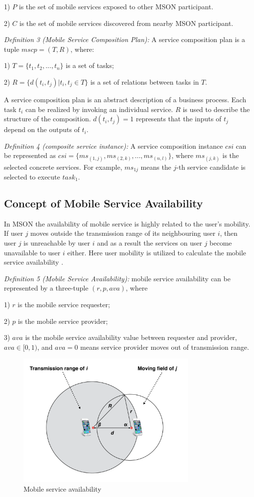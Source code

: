 \documentclass[10pt,journal,compsoc]{IEEEtran}
\begin{document}
​1) $P$ is the set of mobile services exposed to other MSON participant.

​2) $C$ is the set of mobile services discovered from nearby MSON participant.

\textit{Definition 3 (Mobile Service Composition Plan):} A service composition plan is a tuple $mscp = (T, R)$, where:

​1) $T = \{t_1,t_2,...,t_n\}$ is a set of tasks;

​2) $R = \{d(t_i,t_j)|t_i,t_j \in T\}$ is a set of relations between tasks in $T$.

​A service composition plan is an abstract description of a business process. Each task $t_i$ can be realized by invoking an individual service. $R$ is used to describe the structure of the composition. $d(t_i, t_j) = 1$ represents that the inputs of $t_j$ depend on the outputs of $t_i$.

\textit{Definition 4 (composite service instance):} A service composition instance $csi$ can be represented as $csi = \{ms_{(1,j)}, ms_{(2,k)},...,ms_{(n,l)}\}$, where $ms_{(j,k)}$ is the selected concrete services. For example, $ms_{1j}$ means the $j$-th service candidate is selected to execute $task_1$.

\subsection{Concept of Mobile Service Availability}
In MSON the availability of mobile service is highly related to the user’s mobility. If user $j$ moves outside the transmission range of its neighbouring user $i$, then user $j$ is unreachable by user $i$ and as a result the services on user $j$ become unavailable to user $i$ either. Here user mobility is utilized to calculate the mobile service availability \cite{Yang2010}.

\textit{Definition 5 (Mobile Service Availability):} mobile service availability can be represented by a three-tuple $(r, p, ava) $, where

​1) $r$ is the mobile service requester;

​2) $p$ is the mobile service provider;

​3) $ava$ is the mobile service availability value between requester and provider, $ava \in [0,1)$, and $ava=0$ means service provider moves out of transmission range.


\begin{figure}[!t]
\centering
\includegraphics[width=3.5in]{./img/pic3.pdf}
\caption{Mobile service availability}
\label{fig_sd}
\end{figure}
\end{document}
